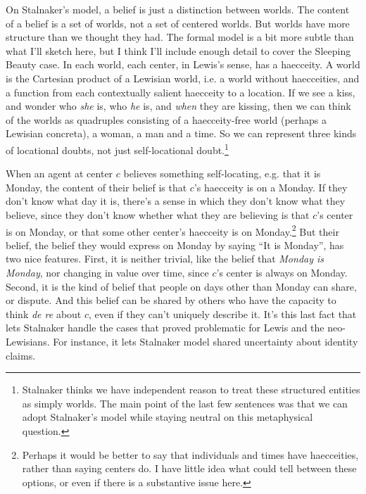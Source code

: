 On Stalnaker's model, a belief is just a distinction between worlds. The content of a belief is a set of worlds, not a set of centered worlds. But worlds have more structure than we thought they had. The formal model is a bit more subtle than what I'll sketch here, but I think I'll include enough detail to cover the Sleeping Beauty case. In each world, each center, in Lewis's sense, has a haecceity. A world is the Cartesian product of a Lewisian world, i.e. a world without haecceities, and a function from each  contextually salient haecceity to a location. If we see a kiss, and wonder who \textit{she} is, who \textit{he} is, and \textit{when} they are kissing, then we can think of the worlds as quadruples consisting of a haecceity-free world (perhaps a Lewisian concreta), a woman, a man and a time. So we can represent three kinds of locational doubts, not just self-locational doubt.\footnote{Stalnaker thinks we have independent reason to treat these structured entities as simply worlds. The main point of the last few sentences was that we can adopt Stalnaker's model while staying neutral on this metaphysical question.} 

When an agent at center \(c\) believes something self-locating, e.g. that it is Monday, the content of their belief is that \(c\)'s haecceity is on a Monday. If they don't know what day it is, there's a sense in which they don't know what they believe, since they don't know whether what they are believing is that \(c\)'s center is on Monday, or that some other center's haecceity is on Monday.\footnote{Perhaps it would be better to say that individuals and times have haecceities, rather than saying centers do. I have little idea what could tell between these options, or even if there is a substantive issue here.} But their belief, the belief they would express on Monday by saying ``It is Monday'', has two nice features. First, it is neither trivial, like the belief that \textit{Monday is Monday}, nor changing in value over time, since \(c\)'s center is always on Monday. Second, it is the kind of belief that people on days other than Monday can share, or dispute. And this belief can be shared by others who have the capacity to think \textit{de re} about \(c\), even if they can't uniquely describe it. It's this last fact that lets Stalnaker handle the cases that proved problematic for Lewis and the neo-Lewisians. For instance, it lets Stalnaker model shared uncertainty about identity claims.

